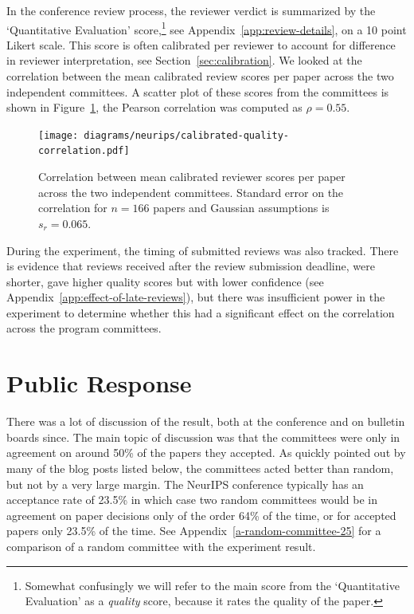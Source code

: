 \documentclass[twoside]{article}
\begin{document}
In the conference review process, the reviewer verdict is summarized by the `Quantitative Evaluation'
score,\footnote{Somewhat confusingly we will refer to the main score from the `Quantitative Evaluation' as a \emph{quality} score, because it rates the quality of the paper.} see Appendix~\ref{app:review-details}, on a 10 point Likert
scale.  This score is often calibrated per reviewer to account for
difference in reviewer interpretation, see
Section~\ref{sec:calibration}. We looked at the correlation between
the mean calibrated review
scores per paper across the two independent committees. A scatter plot of these
scores from the committees is shown in Figure~\ref{figure-calibrated-quality-correlation}, the Pearson correlation
was computed as $\rho=0.55$. 
\begin{figure}[htb]
\centering
\texttt{[image: diagrams/neurips/calibrated-quality-correlation.pdf]}

\caption{Correlation between mean calibrated reviewer scores per paper
  across the two
  independent committees. Standard error on the correlation for
  $n=166$ papers and Gaussian assumptions is $s_r = 0.065$.}
\label{figure-calibrated-quality-correlation}
\end{figure}

During the experiment, the timing of submitted reviews was also
tracked. There is evidence that reviews received after the review submission
deadline, were shorter, gave higher quality scores but with lower
confidence (see Appendix~\ref{app:effect-of-late-reviews}), but there
was insufficient power in the experiment to determine whether this had
a significant effect on the correlation across the program committees.

\section{Public Response}
There was a lot of discussion of the result, both at the
conference and on bulletin boards since. The main topic of discussion
was that the committees were only in agreement on around 50\% of the papers
they accepted. As quickly pointed out by many of the blog posts listed
below, the committees acted better than random, but not by a very large margin. The NeurIPS conference typically has an acceptance rate
of 23.5\% in which case two random committees would be in agreement on
paper decisions only of the order 64\% of the time, or for accepted papers only 
23.5\% of the time. See Appendix~\ref{a-random-committee-25} for a comparison of a random committee with the experiment result.
\end{document}
